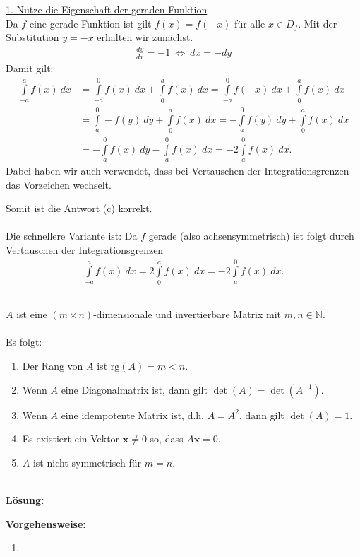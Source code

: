 \underline{1. Nutze die Eigenschaft der geraden Funktion }\\
Da $f$ eine gerade Funktion ist gilt $f(x) = f(-x)$ für alle $x \in D_f$.
Mit der Substitution $y = -x $ erhalten wir zunächst.
\begin{align*}
	\frac{dy}{dx} = -1 
	\ \Leftrightarrow \
	dx = - dy
\end{align*}
Damit gilt:
\begin{align*}
	\int \limits_{- a}^a f(x) \ dx
	&=
	\int \limits_{-a}^0 f(x) \ dx
	+ 
	\int \limits_{0}^a f(x) \ dx
	=
	\int \limits_{-a}^0 f(-x) \ dx
	+ 
	\int \limits_{0}^a f(x) \ dx\\
	&=
	\int \limits_{a}^0 -f(y) \ dy
	+ 
	\int \limits_{0}^a f(x) \ dx
	=
	-\int \limits_{a}^0 f(y) \ dy
	+ 
	\int \limits_{0}^a f(x) \ dx\\
	&=
	-\int \limits_{a}^0 f(x) \ dy
	- 
	\int \limits_{a}^0 f(x) \ dx
	= 
	-2 
	\int \limits_{a}^0 f(x) \ dx.
\end{align*}
Dabei haben wir auch verwendet, dass bei Vertauschen der Integrationsgrenzen das Vorzeichen wechselt.

Somit ist die Antwort (c) korrekt.\\
\\
Die schnellere Variante ist:
Da $f$ gerade (also achsensymmetrisch) ist folgt durch Vertauschen der Integrationsgrenzen
\begin{align*}
	\int \limits_{- a}^a f(x) \ dx
	=
	2 \int \limits_{0}^a f(x) \ dx
	= 
	- 2 \int \limits_{a}^0 f(x) \ dx.
\end{align*}


\newpage
\subsection*{}
$A$ ist eine $(m \times n)$-dimensionale und invertierbare Matrix mit $m,n \in \mathbb{N}$.\\
\\
Es folgt:
\renewcommand{\labelenumi}{(\alph{enumi})}
\begin{enumerate}
	\item 
	Der Rang von $A$ ist $\mathrm{rg}(A) = m < n$.
	\item 
	Wenn $A$ eine Diagonalmatrix ist, dann gilt $\det(A) = \det(A^{-1})$.
	\item 
	Wenn $A$ eine idempotente Matrix ist, d.h. $A = A^2$, dann gilt $\det(A) = 1$.
	\item 
	Es existiert ein Vektor $\mathbf{x} \neq 0$ so, dass $A \mathbf{x} = 0$.
	\item 
	$A$ ist nicht symmetrisch  für $m=n$. 
\end{enumerate}
\ \\
\textbf{Lösung:}
\begin{mdframed}
\underline{\textbf{Vorgehensweise:}}
\renewcommand{\labelenumi}{\theenumi.}
\begin{enumerate}
\item 
\end{enumerate}
\end{mdframed}

